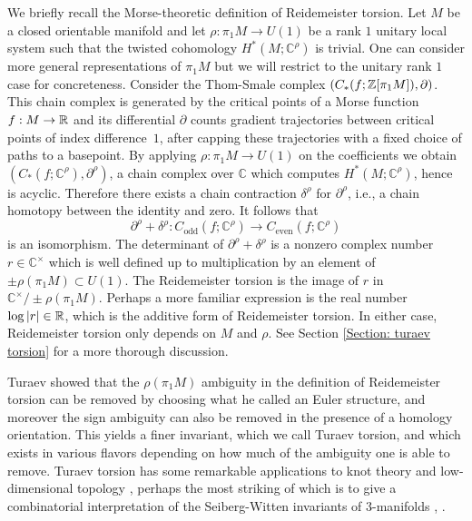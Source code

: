 \documentclass[11pt]{article}
\newcommand{\ie}{i.e.,\xspace}
\numberwithin{equation}{section}\providecommand{\dpl}{\displaystyle}
\theoremstyle{plain}
\theoremstyle{definition}
\newcommand{\bC}{\mathbb{C}}\newcommand{\bD}{\mathbb{D}}
\begin{document}
We briefly recall the Morse-theoretic definition of Reidemeister torsion. Let $M$ be a closed orientable manifold and let $\rho:\pi_1M \to U(1)$ be a rank $1$ unitary local system such that the twisted cohomology $H^*(M;\bC^\rho)$ is trivial. One can consider more general representations of $\pi_1M$ but we will restrict to the unitary rank $1$ case for concreteness. Consider the Thom-Smale complex $(C_*(f ; \mathbb{Z}[\pi_1M]), \partial)$. This chain complex is generated by the critical points of a Morse function $f:M \to \mathbb{R}$ and its differential $\partial$ counts gradient trajectories between critical points of index difference~$1$, after capping these trajectories with a fixed choice of paths to a basepoint. By applying $\rho:\pi_1M \to U(1)$ on the coefficients we obtain $(C_*(f;\bC^\rho), \partial^\rho)$, a chain complex over $\bC$ which computes $H^*(M; \bC^\rho)$, hence is acyclic. Therefore there exists a chain contraction $\delta^\rho$ for $\partial^\rho$, \ie a chain homotopy between the identity and zero. It follows that
\[
\partial^\rho+ \delta^\rho: C_{\text{odd}}(f;\bC^\rho) \to C_{\text{even}}(f;\bC^\rho)
\]
is an isomorphism. The determinant of $\partial^\rho+\delta^\rho$ is a nonzero complex number $r \in \bC^\times$ which is well defined up to multiplication by an element of $\pm \rho( \pi_1M) \subset U(1)$. The Reidemeister torsion is the image of $r$ in $\bC^\times / \pm \rho( \pi_1M)$. Perhaps a more familiar expression is the real number $\log | r | \in \mathbb{R}$, which is the additive form of Reidemeister torsion. In either case, Reidemeister torsion only depends on $M$ and $\rho$. See Section \ref{Section: turaev torsion} for a more thorough discussion.

Turaev showed that the $\rho(\pi_1M)$ ambiguity in the definition of Reidemeister torsion can be removed by choosing what he called an Euler structure, and moreover the sign ambiguity can also be removed in the presence of a homology orientation. This yields a finer invariant, which we call Turaev torsion, and which exists in various flavors depending on how much of the ambiguity one is able to remove. Turaev torsion has some remarkable applications to knot theory and low-dimensional topology \cite{T86}, perhaps the most striking of which is to give a combinatorial interpretation of the Seiberg-Witten invariants of 3-manifolds \cite{MT96}, \cite{T98}.
\end{document}
